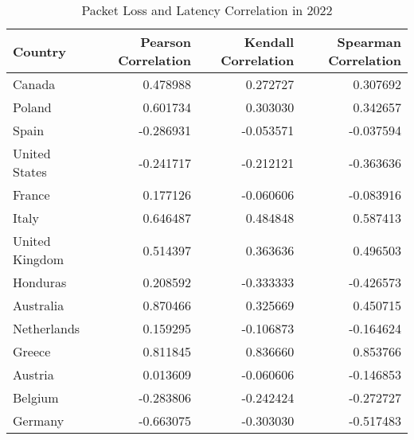 \begin{table}
	\caption{Packet Loss and Latency Correlation in 2022}
	\label{fig:packetloss-latency-correlation-2022}
	\begin{tabular}{lrrr}
		\toprule
		Country        & Pearson Correlation & Kendall Correlation & Spearman Correlation \\
		\midrule
		Canada         & 0.478988            & 0.272727            & 0.307692             \\
		Poland         & 0.601734            & 0.303030            & 0.342657             \\
		Spain          & -0.286931           & -0.053571           & -0.037594            \\
		United States  & -0.241717           & -0.212121           & -0.363636            \\
		France         & 0.177126            & -0.060606           & -0.083916            \\
		Italy          & 0.646487            & 0.484848            & 0.587413             \\
		United Kingdom & 0.514397            & 0.363636            & 0.496503             \\
		Honduras       & 0.208592            & -0.333333           & -0.426573            \\
		Australia      & 0.870466            & 0.325669            & 0.450715             \\
		Netherlands    & 0.159295            & -0.106873           & -0.164624            \\
		Greece         & 0.811845            & 0.836660            & 0.853766             \\
		Austria        & 0.013609            & -0.060606           & -0.146853            \\
		Belgium        & -0.283806           & -0.242424           & -0.272727            \\
		Germany        & -0.663075           & -0.303030           & -0.517483            \\
		\bottomrule
	\end{tabular}
\end{table}

